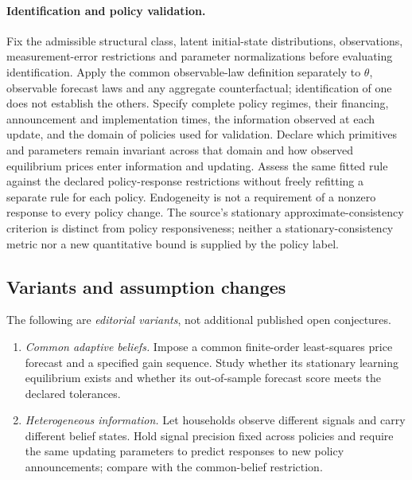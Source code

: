 \documentclass[11pt,a4paper]{article}
\begin{document}
\paragraph{Identification and policy validation.} Fix the admissible structural class, latent initial-state distributions, observations, measurement-error restrictions and parameter normalizations before evaluating identification. Apply the common observable-law definition separately to \(\theta\), observable forecast laws and any aggregate counterfactual; identification of one does not establish the others. Specify complete policy regimes, their financing, announcement and implementation times, the information observed at each update, and the domain of policies used for validation. Declare which primitives and parameters remain invariant across that domain and how observed equilibrium prices enter information and updating. Assess the same fitted rule against the declared policy-response restrictions without freely refitting a separate rule for each policy. Endogeneity is not a requirement of a nonzero response to every policy change. The source's stationary approximate-consistency criterion is distinct from policy responsiveness; neither a stationary-consistency metric nor a new quantitative bound is supplied by the policy label.
\subsection*{Variants and assumption changes}
The following are \emph{editorial variants}, not additional published open conjectures.
\begin{enumerate}
\item \emph{Common adaptive beliefs.} Impose a common finite-order least-squares price forecast and a specified gain sequence. Study whether its stationary learning equilibrium exists and whether its out-of-sample forecast score meets the declared tolerances.
\item \emph{Heterogeneous information.} Let households observe different signals and carry different belief states. Hold signal precision fixed across policies and require the same updating parameters to predict responses to new policy announcements; compare with the common-belief restriction.
\end{enumerate}
\end{document}

